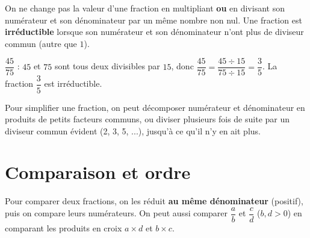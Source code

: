 \begin{propriete}
On ne change pas la valeur d'une fraction en multipliant \textbf{ou} en divisant son
numérateur et son dénominateur par un même nombre non nul. Une fraction est
\textbf{irréductible} lorsque son numérateur et son dénominateur n'ont plus de diviseur
commun (autre que $1$).
\end{propriete}

\begin{exemple}
$\dfrac{45}{75}$ : $45$ et $75$ sont tous deux divisibles par $15$, donc
$\dfrac{45}{75}=\dfrac{45\div15}{75\div15}=\dfrac35$. La fraction $\dfrac35$ est irréductible.
\end{exemple}

\begin{illus}
\end{illus}

\begin{aretenir}
Pour simplifier une fraction, on peut décomposer numérateur et dénominateur en produits de
petits facteurs communs, ou diviser plusieurs fois de suite par un diviseur commun évident
(2, 3, 5, ...), jusqu'à ce qu'il n'y en ait plus.
\end{aretenir}

\section{Comparaison et ordre}

\begin{propriete}
Pour comparer deux fractions, on les réduit \textbf{au même dénominateur} (positif), puis on
compare leurs numérateurs. On peut aussi comparer $\dfrac ab$ et $\dfrac cd$ ($b,d>0$) en
comparant les produits en croix $a\times d$ et $b\times c$.
\end{propriete}

